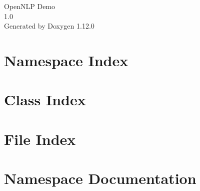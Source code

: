 \documentclass[twoside]{book}
\newcommand{\+}{\discretionary{\mbox{\scriptsize$\hookleftarrow$}}{}{}}
\newcommand{\clearemptydoublepage}{%
    \newpage{\pagestyle{empty}\cleardoublepage}%
  }
\begin{document}
  \raggedbottom
    \hypersetup{pageanchor=false,
                bookmarksnumbered=true,
                pdfencoding=unicode
               }
  \begin{titlepage}
  \vspace*{7cm}
  \begin{center}%
  {\Large Open\+NLP Demo}\\
  [1ex]\large 1.\+0 \\
  \vspace*{1cm}
  {\large Generated by Doxygen 1.12.0}\\
  \end{center}
  \end{titlepage}
  \clearemptydoublepage
  \tableofcontents
  \clearemptydoublepage
  \hypersetup{pageanchor=true}
\chapter{Namespace Index}

\chapter{Class Index}

\chapter{File Index}

\chapter{Namespace Documentation}


\end{document}
